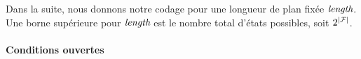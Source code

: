 


Dans la suite, nous donnons notre codage pour une longueur de plan fixée $\textit{length}$. Une borne supérieure pour $\textit{length}$ est le nombre total d'états possibles, soit $2^{\mid\mathcal{F}\mid}$.

\paragraph*{Conditions ouvertes}

